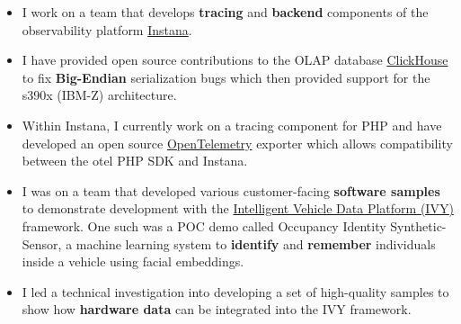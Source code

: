 \documentclass[10pt,a4paper,normalphoto]{altacv}
\begin{document}
\vspace{-10px}
\begin{paracol}{2}



\begin{itemize}
    \item I work on a team that develops \textbf{tracing} and \textbf{backend} components of the observability platform \href{https://www.ibm.com/products/instana}{Instana}.
    \item I have provided open source contributions to the OLAP database \href{https://clickhouse.com/}{ClickHouse} to fix \textbf{Big-Endian} serialization bugs which then provided support for the s390x (IBM-Z) architecture.
    \item Within Instana, I currently work on a tracing component for PHP and have developed an open source \href{https://opentelemetry.io/}{OpenTelemetry} exporter which allows compatibility between the otel PHP SDK and Instana.
\end{itemize}

\divider

\begin{itemize}
    \item I was on a team that developed various customer-facing \textbf{software samples} to demonstrate development with the \href{https://blackberry.qnx.com/en/products/automotive/blackberry-ivy}{Intelligent Vehicle Data Platform (IVY)} framework. One such was a POC demo called Occupancy Identity Synthetic-Sensor, a machine learning system to \textbf{identify} and \textbf{remember} individuals inside a vehicle using facial embeddings.
    \item I led a technical investigation into developing a set of high-quality samples to show how \textbf{hardware data} can be integrated into the IVY framework.
\end{itemize}

\divider


\end{paracol}
\end{document}

